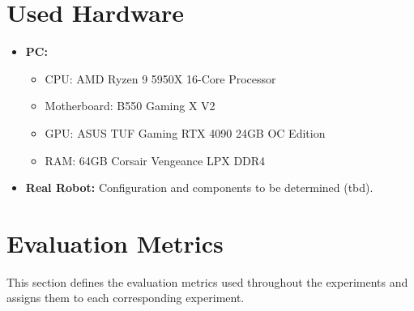 \section{Used Hardware}
\begin{itemize}
    \item \textbf{PC:}
    \begin{itemize}
        \item CPU: AMD Ryzen 9 5950X 16-Core Processor
        \item Motherboard: B550 Gaming X V2
        \item GPU: ASUS TUF Gaming RTX 4090 24GB OC Edition
        \item RAM: 64GB Corsair Vengeance LPX DDR4
    \end{itemize}
    \item \textbf{Real Robot:} Configuration and components to be determined (tbd).
\end{itemize}

\section{Evaluation Metrics}
This section defines the evaluation metrics used throughout the experiments and assigns them to each corresponding experiment.

